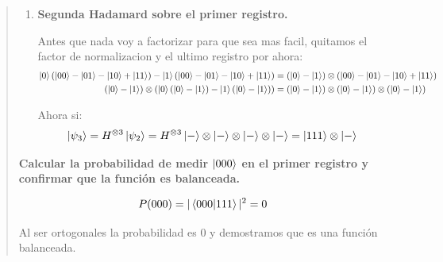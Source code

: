 \begin{quote}
\begin{enumerate}
    \item \textbf{Segunda Hadamard sobre el primer registro.}

        Antes que nada voy a factorizar para que sea mas facil, quitamos el factor de normalizacion
        y el ultimo registro por ahora:
        \begin{align*}
            \ket{0} (\ket{00}-\ket{01}-\ket{10}+\ket{11}) - \ket{1} (\ket{00}
            -\ket{01}-\ket{10}+\ket{11}) &= (\ket{0}-\ket{1}) \otimes
            (\ket{00}-\ket{01}-\ket{10}+\ket{11}) \\ 
            (\ket{0}-\ket{1}) \otimes ( \ket{0} (\ket{0}-\ket{1}) - \ket{1}(\ket{0}-\ket{1})) &=
            (\ket{0}-\ket{1}) \otimes (\ket{0}-\ket{1})\otimes (\ket{0}-\ket{1}) 
        \end{align*}

        Ahora si:
        \begin{align*}
            \ket{\psi_3} = H^{\otimes 3} \ket{\psi_2} = H^{\otimes 3} \ket{-} \otimes \ket{-}
            \otimes \ket{-} \otimes \ket{-} = \ket{111} \otimes \ket{-} 
        \end{align*}
\end{enumerate}

    \textbf{Calcular la probabilidad de medir $\ket{000}$ en el primer registro y confirmar que la
    función es balanceada.}

    $$
    P(000) = |\bra{000}\ket{111}| ^2 = 0
    $$

    Al ser ortogonales la probabilidad es 0 y demostramos que es una función balanceada. 
\end{quote}
\vspace{.5cm}


